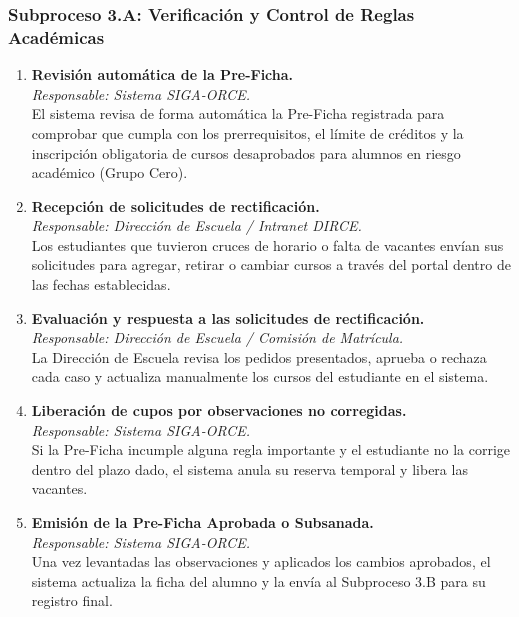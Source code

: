 \subsubsection{Subproceso 3.A: Verificación y Control de Reglas Académicas}

\begin{enumerate}
    \item \textbf{Revisión automática de la Pre-Ficha.} \\
    \textit{Responsable: Sistema SIGA-ORCE.} \\
    El sistema revisa de forma automática la Pre-Ficha registrada para comprobar que cumpla con los prerrequisitos, el límite de créditos y la inscripción obligatoria de cursos desaprobados para alumnos en riesgo académico (Grupo Cero).

    \item \textbf{Recepción de solicitudes de rectificación.} \\
    \textit{Responsable: Dirección de Escuela / Intranet DIRCE.} \\
    Los estudiantes que tuvieron cruces de horario o falta de vacantes envían sus solicitudes para agregar, retirar o cambiar cursos a través del portal dentro de las fechas establecidas.

    \item \textbf{Evaluación y respuesta a las solicitudes de rectificación.} \\
    \textit{Responsable: Dirección de Escuela / Comisión de Matrícula.} \\
    La Dirección de Escuela revisa los pedidos presentados, aprueba o rechaza cada caso y actualiza manualmente los cursos del estudiante en el sistema.

    \item \textbf{Liberación de cupos por observaciones no corregidas.} \\
    \textit{Responsable: Sistema SIGA-ORCE.} \\
    Si la Pre-Ficha incumple alguna regla importante y el estudiante no la corrige dentro del plazo dado, el sistema anula su reserva temporal y libera las vacantes.

    \item \textbf{Emisión de la Pre-Ficha Aprobada o Subsanada.} \\
    \textit{Responsable: Sistema SIGA-ORCE.} \\
    Una vez levantadas las observaciones y aplicados los cambios aprobados, el sistema actualiza la ficha del alumno y la envía al Subproceso 3.B para su registro final.
\end{enumerate}
